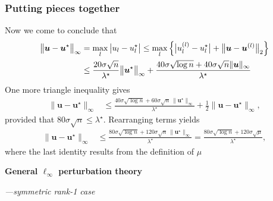 \documentclass[compress,
mathserif,wide,%
]{beamer}
\begin{document}
\begin{frame}
	\frametitle{Putting pieces together}
Now we come to conclude that 
%
\begin{align*}
\big\|\bm{u}-\bm{u}^{\star}\big\|_{\infty} & =\max_{l}\big|u_{l}-u_{l}^{\star}\big|\leq\max_{l}\Big\{\big|u_{l}^{(l)}-u_{l}^{\star}\big|+\big\|\bm{u}-\bm{u}^{(l)}\big\|_{2}\Big\} \notag\\
 & \leq \frac{20\sigma\sqrt{n}}{\lambda^{\star}} \big\|\bm{u}^{\star}\big\|_{\infty}
	+ \frac{40\sigma\sqrt{\log n}+40\sigma\sqrt{n}\|\bm{u}\|_{\infty}}{\lambda^{\star}}
\end{align*}
%
One more triangle inequality gives 
\begin{align*}
\big\|\bm{u}-\bm{u}^{\star}\big\|_{\infty}
	& \leq \frac{40\sigma\sqrt{\log n} + 60 \sigma \sqrt{n}\, \|\bm{u}^{\star}\|_{\infty} }{\lambda^{\star}}+\frac{1}{2}\big\|\bm{u}-\bm{u}^{\star}\big\|_{\infty},
\end{align*}
%
provided that $80\sigma\sqrt{n}\leq\lambda^{\star}$. Rearranging terms yields
\begin{align*}
	 \big\|\bm{u}-\bm{u}^{\star}\big\|_{\infty}
	 &\leq \frac{ 80\sigma\sqrt{\log n} + 120 \sigma \sqrt{n}\, \|\bm{u}^{\star}\|_{\infty} }{\lambda^{\star}}
	 = \frac{80\sigma\sqrt{\log n} + 120 \sigma \sqrt{\mu} }{\lambda^{\star}} ,
\end{align*}
%
where the last identity results from the definition of $\mu$
\end{frame}

\begin{frame}[plain]
\vfill
\centering
{\Large \bf General $\ell_{\infty}$ perturbation theory}

{\hfill \large \em ---symmetric rank-1 case}
\vfill
\end{frame}
\end{document}
